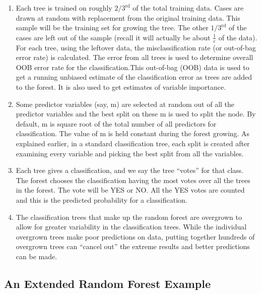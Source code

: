 \documentclass[12pt,twoside]{reedthesis}
\begin{document}
  \begin{enumerate}
  \def\labelenumi{\arabic{enumi}.}
  \item
    Each tree is trained on roughly \(2/3^{\text{rd}}\) of the total
    training data. Cases are drawn at random with replacement from the
    original training data. This sample will be the training set for
    growing the tree. The other \(1/3^{\text{rd}}\) of the cases are left
    out of the sample (recall it will actually be about \(\frac{1}{e}\) of
    the data). For each tree, using the leftover data, the
    misclassification rate (or out-of-bag error rate) is calculated. The
    error from all trees is used to determine overall OOB error rate for
    the classification.This out-of-bag (OOB) data is used to get a running
    unbiased estimate of the classification error as trees are added to
    the forest. It is also used to get estimates of variable importance.
  \item
    Some predictor variables (say, m) are selected at random out of all
    the predictor variables and the best split on these m is used to split
    the node. By default, m is square root of the total number of all
    predictors for classification. The value of m is held constant during
    the forest growing. As explained earlier, in a standard classification
    tree, each split is created after examining every variable and picking
    the best split from all the variables.
  \item
    Each tree gives a classification, and we say the tree ``votes'' for
    that class. The forest chooses the classification having the most
    votes over all the trees in the forest. The vote will be YES or NO.
    All the YES votes are counted and this is the predicted probability
    for a classification.
  \item
    The classification trees that make up the random forest are overgrown
    to allow for greater variability in the classification trees. While
    the individual overgrown trees make poor predictions on data, putting
    together hundreds of overgrown trees can ``cancel out'' the extreme
    results and better predictions can be made.
  \end{enumerate}
  
  \subsection{An Extended Random Forest
  Example}\label{an-extended-random-forest-example}
  
\end{document}
